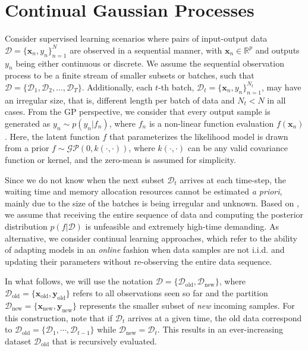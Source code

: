 \documentclass[]{article}
\newcommand{\Dcal}{\mathcal{D}}
\newcommand{\xc}{\bm{x}}
\newcommand{\yc}{\bm{y}}
\newcommand{\xcnew}{{\xc_{\text{new}}}}
\newcommand{\ycnew}{{\yc_{\text{new}}}}
\newcommand{\xcold}{{\xc_{\text{old}}}}
\newcommand{\ycold}{{\yc_{\text{old}}}}
\begin{document}
\section{Continual Gaussian Processes}

\label{sec:continual_gp}

Consider supervised learning scenarios where pairs of input-output data $\Dcal = \{\xc_n, y_n\}^N_{n=1}$ are observed in a sequential manner, with $\xc_n \in \mathbb{R}^p$ and outputs $y_n$ being either continuous or discrete. We assume the sequential observation process to be a finite stream of smaller subsets or batches, such that $\Dcal = \{\Dcal_1, \Dcal_2, \dots, \Dcal_{T}\}$. Additionally, each $t$-th batch, $\Dcal_t = \{\xc_n, y_n\}^{N_t}_{n=1}$, may have an irregular size, that is, different length per batch of data and $N_t < N$ in all cases. From the GP perspective, we consider that every output sample is generated as $y_n \sim p(y_n|f_n)$, where $f_n$ is a non-linear function evaluation $f(\xc_n)$. Here, the latent function $f$ that parameterizes the likelihood model is drawn from a prior $f\sim \mathcal{GP}(0, k(\cdot, \cdot))$, where $k(\cdot, \cdot)$ can be any valid covariance function or kernel, and the zero-mean is assumed for simplicity.

Since we do not know when the next subset $\Dcal_t$ arrives at each time-step, the waiting time and memory allocation resources cannot be estimated \textit{a priori}, mainly due to the size of the batches is being irregular and unknown. Based on \citet{bui2017streaming}, we assume that receiving the entire sequence of data and computing the posterior distribution $p(f|\Dcal)$ is unfeasible and extremely high-time demanding. As alternative, we consider continual learning approaches, which refer to the ability of adapting models in an \textit{online} fashion when data samples are not i.i.d. and updating their parameters without re-observing the entire data sequence. 

In what follows, we will use the notation $\Dcal = \{\Dcal_{\text{old}}, \Dcal_{\text{new}}\}$, where $\mathcal{D}_{\text{old}} = \{\xcold, \ycold\}$ refers to all observations seen so far and the partition $\Dcal_{\text{new}}= \{\xcnew, \ycnew\}$ represents the smaller subset of \textit{new} incoming samples. For this construction, note that if $\Dcal_t$ arrives at a given time, the old data correspond to $\Dcal_{\text{old}}=\{\Dcal_1,\cdots, \Dcal_{t-1}\}$ while $\Dcal_{\text{new}}=\Dcal_t$. This results in an ever-increasing dataset $\Dcal_{\text{old}}$ that is recursively evaluated.
\end{document}
